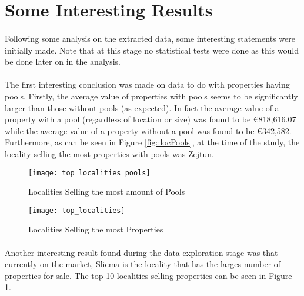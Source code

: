 \section{Some Interesting Results}
\paragraph{ }Following some analysis on the extracted data, some interesting statements were initially made. Note that at this stage no statistical tests were done as this would be done later on in the analysis.

\paragraph{ }The first interesting conclusion was made on data to do with properties having pools. Firstly, the average value of properties with pools seems to be significantly larger than those without pools (as expected). In fact the average value of a property with a pool (regardless of location or size) was found to be \euro 818,616.07 while the average value of a property without a pool was found to be \euro 342,582. Furthermore, as can be seen in Figure \ref{fig::locPools}, at the time of the study, the locality selling the most properties with pools was Zejtun. 

\begin{figure}[!b]
	\begin{minipage}[b]{0.45\linewidth}
		\centering
		\texttt{[image: top\_localities\_pools]}
		\caption[Pools]{Localities Selling the most amount of Pools}
		\label{fig::locPools}
	\end{minipage}	
	\hspace{0.5cm}
	\begin{minipage}[b]{0.45\linewidth}
		\centering
		\texttt{[image: top\_localities]}
		\caption[Top Localities]{Localities Selling the most Properties}
		\label{fig::toplocalities}
	\end{minipage}	
\end{figure}

\paragraph{ }Another interesting result found during the data exploration stage was that currently on the market, Sliema is the locality that has the larges number of properties for sale. The top 10 localities selling properties can be seen in Figure \ref{fig::toplocalities}.

